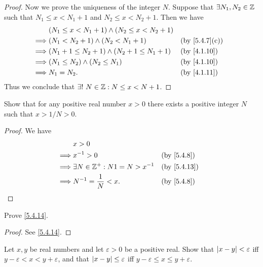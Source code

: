 \begin{proof}
  Now we prove the uniqueness of the integer \(N\).
  Suppose that \(\exists N_1, N_2 \in \mathbb{Z}\) such that \(N_1 \leq x < N_1 + 1\) and \(N_2 \leq x < N_2 + 1\).
  Then we have
  \begin{align*}
             & (N_1 \leq x < N_1 + 1) \land (N_2 \leq x < N_2 + 1)                                  \\
    \implies & (N_1 < N_2 + 1) \land (N_2 < N_1 + 1)               &  & \text{(by \cref{5.4.7}(c))} \\
    \implies & (N_1 + 1 \leq N_2 + 1) \land (N_2 + 1 \leq N_1 + 1) &  & \by{4.1.10}                 \\
    \implies & (N_1 \leq N_2) \land (N_2 \leq N_1)                 &  & \by{4.1.10}                 \\
    \implies & N_1 = N_2.                                          &  & \by{4.1.11}
  \end{align*}
  Thus we conclude that \(\exists!\ N \in \mathbb{Z} : N \leq x < N + 1\).
\end{proof}

\begin{ex}\label{ex:5.4.4}
  Show that for any positive real number \(x > 0\) there exists a positive integer \(N\) such that \(x > 1 / N > 0\).
\end{ex}

\begin{proof}
  We have
  \begin{align*}
             & x > 0                                                 \\
    \implies & x^{-1} > 0                           &  & \by{5.4.8}  \\
    \implies & \exists N \in \Z^+ : N1 = N > x^{-1} &  & \by{5.4.13} \\
    \implies & N^{-1} = \dfrac{1}{N} < x.           &  & \by{5.4.8}
  \end{align*}
\end{proof}

\begin{ex}\label{ex:5.4.5}
  Prove \cref{5.4.14}.
\end{ex}

\begin{proof}
  See \cref{5.4.14}.
\end{proof}

\begin{ex}\label{ex:5.4.6}
  Let \(x, y\) be real numbers and let \(\varepsilon > 0\) be a positive real.
  Show that \(\left\lvert x - y\right\rvert < \varepsilon\) iff \(y - \varepsilon < x < y + \varepsilon\), and that \(\left\lvert x - y\right\rvert \leq \varepsilon\) iff \(y - \varepsilon \leq x \leq y + \varepsilon\).
\end{ex}

